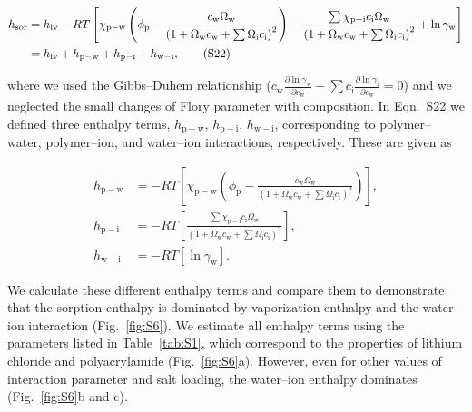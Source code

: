 \documentclass[11pt]{article}
\begin{document}
\begin{align}
h_\mathrm{sor} &= h_\mathrm{lv} - RT\left[\chi_\mathrm{p-w}\left(\phi_\mathrm{p} - \frac{c_\mathrm{w}\Omega_\mathrm{w}}{\left(1+\Omega_\mathrm{w} c_\mathrm{w}+\sum \Omega_\mathrm{i} c_\mathrm{i}\right)^2}\right) - \frac{\sum \chi_\mathrm{p-i} c_\mathrm{i} \Omega_\mathrm{w}}{\left(1+\Omega_\mathrm{w} c_\mathrm{w}+\sum \Omega_\mathrm{i} c_\mathrm{i}\right)^2} + \ln \gamma_\mathrm{w}\right] \notag\\
&= h_\mathrm{lv} + h_\mathrm{p-w} + h_\mathrm{p-i} + h_\mathrm{w-i}, \tag{S22}
\end{align}

where we used the Gibbs--Duhem relationship ($c_\mathrm{w}\frac{\partial \ln \gamma_\mathrm{w}}{\partial c_\mathrm{w}} + \sum c_\mathrm{i}\frac{\partial \ln \gamma_\mathrm{i}}{\partial c_\mathrm{w}}=0$\cite{stolen2003}) and we neglected the small changes of Flory parameter with composition.\cite{graeber2023} In Eqn.~S22 we defined three enthalpy terms, $h_\mathrm{p-w}$, $h_\mathrm{p-i}$, $h_\mathrm{w-i}$, corresponding to polymer--water, polymer--ion, and water--ion interactions, respectively. These are given as

\begin{align}
h_\mathrm{p-w} &= -RT\left[\chi_\mathrm{p-w}\left(\phi_\mathrm{p} - \frac{c_\mathrm{w}\Omega_\mathrm{w}}{\left(1+\Omega_\mathrm{w} c_\mathrm{w}+\sum \Omega_\mathrm{i} c_\mathrm{i}\right)^2}\right)\right], \tag{S23}\\[6pt]
h_\mathrm{p-i} &= -RT\left[\frac{\sum \chi_\mathrm{p-i} c_\mathrm{i}\Omega_\mathrm{w}}{\left(1+\Omega_\mathrm{w} c_\mathrm{w}+\sum \Omega_\mathrm{i} c_\mathrm{i}\right)^2}\right], \tag{S24}\\[6pt]
h_\mathrm{w-i} &= -RT\left[\ln \gamma_\mathrm{w}\right]. \tag{S25}
\end{align}

We calculate these different enthalpy terms and compare them to demonstrate that the sorption enthalpy is dominated by vaporization enthalpy and the water--ion interaction (Fig.~\ref{fig:S6}). We estimate all enthalpy terms using the parameters listed in Table~\ref{tab:S1}, which correspond to the properties of lithium chloride and polyacrylamide (Fig.~\ref{fig:S6}a). However, even for other values of interaction parameter and salt loading, the water--ion enthalpy dominates (Fig.~\ref{fig:S6}b and c).
\end{document}
